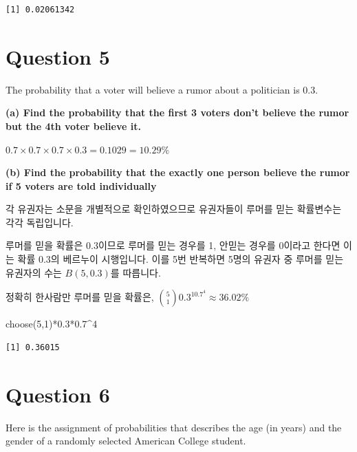 \documentclass[
  a4paper,
  DIV=11,
  numbers=noendperiod]{scrreprt}
\newenvironment{Shaded}{\begin{snugshade}}{\end{snugshade}}
\newcommand{\DecValTok}[1]{\textcolor[rgb]{0.68,0.00,0.00}{#1}}
\newcommand{\FloatTok}[1]{\textcolor[rgb]{0.68,0.00,0.00}{#1}}
\newcommand{\FunctionTok}[1]{\textcolor[rgb]{0.28,0.35,0.67}{#1}}
\newcommand{\NormalTok}[1]{\textcolor[rgb]{0.00,0.23,0.31}{#1}}
\newcommand{\SpecialCharTok}[1]{\textcolor[rgb]{0.37,0.37,0.37}{#1}}
\begin{document}
\begin{verbatim}
[1] 0.02061342
\end{verbatim}

\section*{Question 5}\label{question-5-1}


The probability that a voter will believe a rumor about a politician is
0.3.

\textbf{(a) Find the probability that the first 3 voters don't believe
the rumor but the 4th voter believe it.}

\(0.7\times 0.7\times 0.7\times 0.3=0.1029=10.29\%\)

\textbf{(b) Find the probability that the exactly one person believe the
rumor if 5 voters are told individually}

각 유권자는 소문을 개별적으로 확인하였으므로 유권자들이 루머를 믿는
확률변수는 각각 독립입니다.

루머를 믿을 확률은 0.3이므로 루머를 믿는 경우를 1, 안믿는 경우를 0이라고
한다면 이는 확률 0.3의 베르누이 시행입니다. 이를 5번 반복하면 5명의
유권자 중 루머를 믿는 유권자의 수는 \(B(5,0.3)\)를 따릅니다.

정확히 한사람만 루머를 믿을 확률은,
\({5\choose1}0.3^10.7^4\approx 36.02\%\)

\begin{Shaded}
\begin{Highlighting}[]
\FunctionTok{choose}\NormalTok{(}\DecValTok{5}\NormalTok{,}\DecValTok{1}\NormalTok{)}\SpecialCharTok{*}\FloatTok{0.3}\SpecialCharTok{*}\FloatTok{0.7}\SpecialCharTok{\^{}}\DecValTok{4}
\end{Highlighting}
\end{Shaded}

\begin{verbatim}
[1] 0.36015
\end{verbatim}

\section*{Question 6}\label{question-6-1}


Here is the assignment of probabilities that describes the age (in
years) and the gender of a randomly selected American College student.
\end{document}
